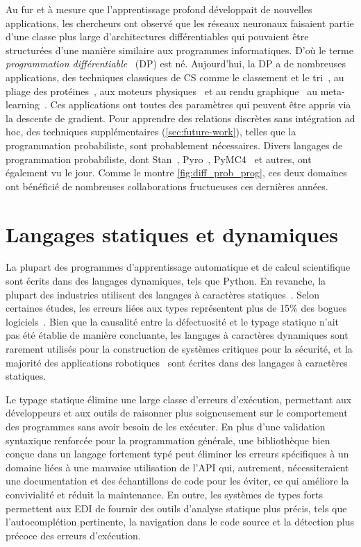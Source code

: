 Au fur et à mesure que l'apprentissage profond développait de nouvelles applications, les chercheurs ont observé que les réseaux neuronaux faisaient partie d'une classe plus large d'architectures différentiables qui pouvaient être structurées d'une manière similaire aux programmes informatiques. D'où le terme \textit{programmation différentiable}~\citep{olah2015neural, baydin2016differentiable, plotkin2018some} (DP) est né. Aujourd'hui, la DP a de nombreuses applications, des techniques classiques de CS comme le classement et le tri~\citep{cuturi2019differentiable, blondel2020fast}, au pliage des protéines~\citep{alquraishi2018end}, aux moteurs physiques~\citep{hu2019difftaichi, de2018end, degrave2016differentiable} et au rendu graphique~\citep{loper2014opendr} au meta-learning~\citep{liu2018darts, chandra2019gradient}. Ces applications ont toutes des paramètres qui peuvent être appris via la descente de gradient. Pour apprendre des relations discrètes sans intégration ad hoc, des techniques supplémentaires (\autoref{sec:future-work}), telles que la programmation probabiliste, sont probablement nécessaires. Divers langages de programmation probabiliste, dont Stan~\citep{carpenter2017stan}, Pyro~\citep{bingham2019pyro}, PyMC4~\citep{kochurov2019pymc4} et autres, ont également vu le jour. Comme le montre \autoref{fig:diff_prob_prog}, ces deux domaines ont bénéficié de nombreuses collaborations fructueuses ces dernières années.

\section{Langages statiques et dynamiques}

La plupart des programmes d'apprentissage automatique et de calcul scientifique sont écrits dans des langages dynamiques, tels que Python. En revanche, la plupart des industries utilisent des langages à caractères statiques~\citep{github}. Selon certaines études, les erreurs liées aux types représentent plus de 15\% des bogues logiciels~\citep{gao2017type}. Bien que la causalité entre la défectuosité et le typage statique n'ait pas été établie de manière concluante, les langages à caractères dynamiques sont rarement utilisés pour la construction de systèmes critiques pour la sécurité, et la majorité des applications robotiques~\citep{guenther2018serious} sont écrites dans des langages à caractères statiques.

Le typage statique élimine une large classe d'erreurs d'exécution, permettant aux développeurs et aux outils de raisonner plus soigneusement sur le comportement des programmes sans avoir besoin de les exécuter. En plus d'une validation syntaxique renforcée pour la programmation générale, une bibliothèque bien conçue dans un langage fortement typé peut éliminer les erreurs spécifiques à un domaine liées à une mauvaise utilisation de l'API qui, autrement, nécessiteraient une documentation et des échantillons de code pour les éviter, ce qui améliore la convivialité et réduit la maintenance. En outre, les systèmes de types forts permettent aux EDI de fournir des outils d'analyse statique plus précis, tels que l'autocomplétion pertinente, la navigation dans le code source et la détection plus précoce des erreurs d'exécution.

